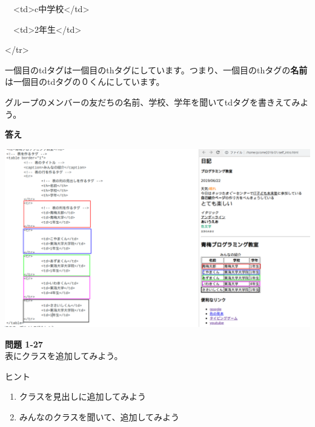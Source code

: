 \ \ {\textless}td{\textgreater}c中学校{\textless}/td{\textgreater}

\ \ {\textless}td{\textgreater}2年生{\textless}/td{\textgreater}

{\textless}/tr{\textgreater}

一個目のtdタグは一個目のthタグにしています。つまり、一個目のthタグの\textbf{名前}は一個目のtdタグの０くんにしています。


\bigskip


\bigskip

グループのメンバーの友だちの名前、学校、学年を聞いてtdタグを書きえてみよう。


\bigskip


\bigskip



\bigskip

\clearpage
\textbf{答え}




\bigskip


\bigskip


\bigskip
\includegraphics[width=\textwidth]{text01-img/textbook-img192.png}




\bigskip

\bigskip

\bigskip

\noindent \textbf{問題 1-27}\\
表にクラスを追加してみよう。

ヒント

\begin{enumerate}
  \item クラスを見出しに追加してみよう
  \item
        みんなのクラスを聞いて、追加してみよう
\end{enumerate}

